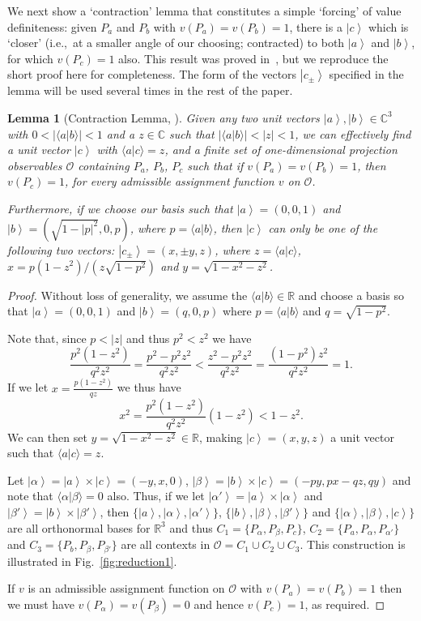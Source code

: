 \documentclass[%
 superscriptaddress,
 preprint,
 showpacs,
 showkeys,
 nofootinbib,
  amsmath,amssymb,
  aps,
  longbibliography,
  floatfix,
 ]{revtex4-1}
\newtheorem{lemma}{Lemma}
\theoremstyle{definition}
\newcommand{\R}{\mathbb{R}}%
\newcommand{\C}{\mathbb{C}}
\newcommand{\ket}[1]{\left| #1 \right>}
\newcommand{\iprod}[2]{\langle #1 | #2 \rangle}
\begin{document}
We next show a `contraction' lemma that constitutes a simple `forcing' of value definiteness: given $P_a$ and $P_b$ with $v(P_a)=v(P_b)=1$, there is a $\ket{c}$ which is `closer' (i.e.,~at a smaller angle of our choosing; contracted) to both $\ket{a}$ and $\ket{b}$, for which $v(P_c)=1$ also.
This result was proved in~\cite{Abbott:2012fk}, but we reproduce the short proof here for completeness.
The form of the vectors $\ket{c_\pm}$ specified in the lemma will be used several times in the rest of the paper.
\begin{lemma}[Contraction Lemma, \cite{Abbott:2012fk}]
	\label{lemma:reduction1}
	 Given any two unit vectors $\ket{a},\ket{b}\in\C^3$ with $0 < |\iprod{a}{b}| < 1$ and a $z\in\C$ such that $|\iprod{a}{b}| < |z| < 1$, we can effectively find a unit vector $\ket{c}$ with $
	\iprod{a}{c}=z$,  and a finite set of {\color{blue}one-dimensional projection} observables $\mathcal{O}$ containing $P_a$, $P_b$, $P_c$
	 such that if $v(P_a)=v(P_b)=1$, then $v(P_c)=1$, for
every admissible assignment function  $v$  on $\mathcal{O}$.
	
	Furthermore, if we choose our basis such that $\ket{a}= (0,0,1)$ and $\ket{b}=(\sqrt{1-|p|^2},0,p)$, where $p=\iprod{a}{b}$, then $\ket{c}$ can only be one of the following two vectors: $\ket{c_\pm}=(x,\pm y,z)$, where $z=\iprod{a}{c}$, $x=p(1-z^2)/(z\sqrt{1-p^2})$ and $y=\sqrt{1-x^2-z^2}$.
\end{lemma}
\begin{proof}
	Without loss of generality, we assume the $\iprod{a}{b}\in \R$ and choose a basis so that $\ket{a}=(0,0,1)$ and $\ket{b}=(q,0,p)$ where $p=\iprod{a}{b}$ and $q=\sqrt{1-p^2}$.
	
	Note that, since $p<|z|$ and thus $p^2<z^2$ we have
	$$\frac{p^2(1-z^2)}{q^2z^2} = \frac{p^2-p^2z^2}{q^2z^2} < \frac{z^2-p^2z^2}{q^2z^2} = \frac{(1-p^2)z^2}{q^2z^2} = 1.$$
	If we let $x=\frac{p(1-z^2)}{qz}$ we thus have
	$$x^2 = \frac{p^2(1-z^2)}{q^2z^2}(1-z^2) < 1-z^2.$$
	We can then set $y = \sqrt{1-x^2-z^2}\in\R$, making $\ket{c}=(x,y,z)$ a unit vector such that $\iprod{a}{c}=z$.
	
	Let $\ket{\alpha}=\ket{a}\times\ket{c}=(-y,x,0)$, $\ket{\beta}=\ket{b}\times\ket{c}=(-py,px-qz,qy)$ and note that $\iprod{\alpha}{\beta}=0$ also.
	Thus, if we let $\ket{\alpha'}=\ket{a}\times\ket{\alpha}$ and $\ket{\beta'}=\ket{b}\times\ket{\beta'}$, then  $\{\ket{a},\ket{\alpha},\ket{\alpha'}\}$, $\{\ket{b},\ket{\beta},\ket{\beta'}\}$ and $\{\ket{\alpha},\ket{\beta},\ket{c}\}$ are all orthonormal bases for $\R^3$ and thus $C_1=\{P_\alpha,P_\beta,P_c\}$, $C_2=\{P_a,P_\alpha,P_{\alpha'}\}$ and $C_3=\{P_b,P_\beta,P_{\beta'}\}$ are all contexts in $\mathcal{O}=C_1\cup C_2 \cup C_3$.
	This construction is illustrated in Fig.~\ref{fig:reduction1}.
	
	If $v$ is an admissible assignment function on $\mathcal{O}$ with $v(P_a)=v(P_b)=1$ then we must have $v(P_\alpha)=v(P_\beta)=0$ and hence $v(P_c)=1$, as required.
\end{proof}
\end{document}
